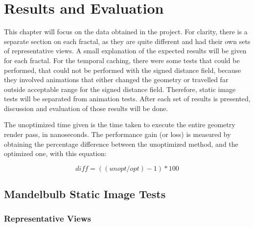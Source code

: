 \chapter{Results and Evaluation}
\label{chapter:results-and-evaluation}

This chapter will focus on the data obtained in the project. For clarity, there is a separate section on each fractal, as they are quite different and had their own sets of representative views. A small explanation of the expected results will be given for each fractal. For the temporal caching, there were some tests that could be performed, that could not be performed with the signed distance field, because they involved animations that either changed the geometry or travelled far outside acceptable range for the signed distance field. Therefore, static image tests will be separated from animation tests. After each set of results is presented, discussion and evaluation of those results will be done.\newline

The unoptimized time given is the time taken to execute the entire geometry render pass, in nanoseconds. The performance gain (or loss) is measured by obtaining the percentage difference between the unoptimized method, and the optimized one, with this equation:

\begin{equation}
	diff = ((unopt / opt) - 1) * 100
\end{equation}

\section{Mandelbulb Static Image Tests}

\subsection{Representative Views}

